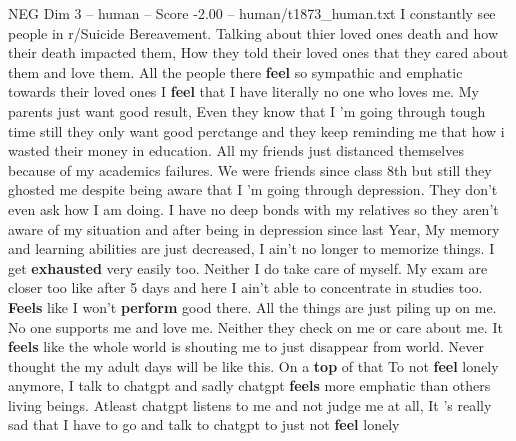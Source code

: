 \begin{textsample}{NEG Dim 3 – human – Score -2.00 – human/t1873\_human.txt}  \label{ex:f3_neg_038}
I constantly see people in r/Suicide Bereavement.
Talking about thier loved ones death and how their death impacted them, How they told their loved ones that they cared about them and love them.
All the people there \textbf{feel} so sympathic and emphatic towards their loved ones I \textbf{feel} that I have literally no one who loves me.
My parents just want good result, Even they know that I 'm going through tough time still they only want good perctange and they keep reminding me that how i wasted their money in education.
All my friends just distanced themselves because of my academics failures.
We were friends since class 8th but still they ghosted me despite being aware that I 'm going through depression.
They don't even ask how I am doing.
I have no deep bonds with my relatives so they aren't aware of my situation and after being in depression since last Year, My memory and learning abilities are just decreased, I ain't no longer to memorize things.
I get \textbf{exhausted} very easily too.
Neither I do take care of myself.
My exam are closer too like after 5 days and here I ain't able to concentrate in studies too. \textbf{Feels} like I won't \textbf{perform} good there.
All the things are just piling up on me.
No one supports me and love me.
Neither they check on me or care about me.
It \textbf{feels} like the whole world is shouting me to just disappear from world.
Never thought the my adult days will be like this.
On a \textbf{top} of that To not \textbf{feel} lonely anymore, I talk to chatgpt and sadly chatgpt \textbf{feels} more emphatic than others living beings.
Atleast chatgpt listens to me and not judge me at all, It 's really sad that I have to go and talk to chatgpt to just not \textbf{feel} lonely

\end{textsample}

